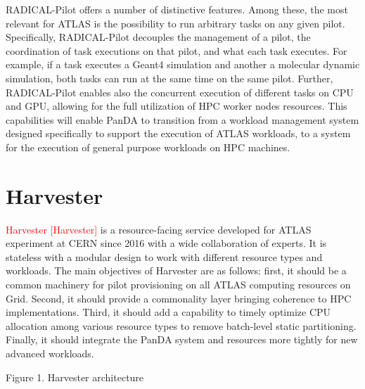 \documentclass{webofc}
\begin{document}
RADICAL-Pilot offers a number of distinctive features. Among these, the most
relevant for ATLAS is the possibility to run arbitrary tasks on any given
pilot. Specifically, RADICAL-Pilot decouples the management of a pilot, the
coordination of task executions on that pilot, and what each task executes.
For example, if a task executes a Geant4 simulation and another a molecular
dynamic simulation, both tasks can run at the same time on the same pilot.
Further, RADICAL-Pilot enables also the concurrent execution of different
tasks on CPU and GPU, allowing for the full utilization of HPC worker nodes
resources. This capabilities will enable PanDA to transition from a workload
management system designed specifically to support the execution of ATLAS
workloads, to a system for the execution of general purpose workloads on HPC
machines.


\section{Harvester}

\textcolor{red}{Harvester [Harvester]} is a resource-facing service developed for ATLAS
experiment at CERN since 2016 with a wide collaboration of experts.  It is
stateless with a modular design to work with different resource types and
workloads. The main objectives of Harvester are as follows: first, it should
be a common machinery for pilot provisioning on all ATLAS computing resources
on Grid. Second, it should provide a commonality layer bringing coherence to
HPC implementations. Third, it should add a capability to timely optimize CPU
allocation among various resource types to remove batch-level static
partitioning. Finally, it should integrate the PanDA system and resources
more tightly for new advanced workloads.

Figure 1. Harvester architecture
\end{document}
